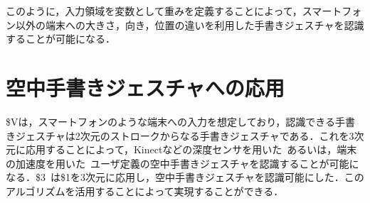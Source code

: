 このように，入力領域を変数として重みを定義することによって，スマートフォン以外の端末への大きさ，向き，位置の違いを利用した手書きジェスチャを認識することが可能になる．

\section{空中手書きジェスチャへの応用}
\$Vは，スマートフォンのような端末への入力を想定しており，認識できる手書きジェスチャは2次元のストロークからなる手書きジェスチャである．これを3次元に応用することによって，Kinectなどの深度センサを用いた~\cite{Tian_kinwrite:handwriting-based}あるいは，端末の加速度を用いた~\cite{Ruiz:2011:UMG:1978942.1978971}ユーザ定義の空中手書きジェスチャを認識することが可能になる．\$3~\cite{Kratz:2010:RSG:1719970.1720051}は\$1を3次元に応用し，空中手書きジェスチャを認識可能にした．このアルゴリズムを活用することによって実現することができる．


